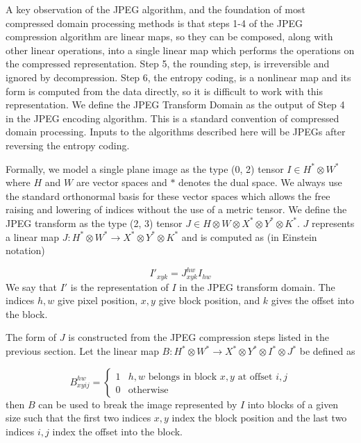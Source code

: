 \documentclass[10pt,twocolumn,letterpaper]{article}
\begin{document}
A key observation of the JPEG algorithm, and the foundation of most compressed domain processing methods \cite{chang1992video, chang1993new, natarajan1995fast, shen1995inner, shen1996direct, shen1998block, smith1993algorithms, smith1994fast} is that steps 1-4 of the JPEG compression algorithm are linear maps, so they can be composed, along with other linear operations, into a single linear map which performs the operations on the compressed representation. Step 5, the rounding step, is irreversible and ignored by decompression. Step 6, the entropy coding, is a nonlinear map and its form is computed from the data directly, so it is difficult to work with this representation. We define the JPEG Transform Domain as the output of Step 4 in the JPEG encoding algorithm. This is a standard convention of compressed domain processing. Inputs to the algorithms described here will be JPEGs after reversing the entropy coding.

Formally, we model a single plane image as the type (0, 2) tensor $I \in H^* \otimes W^*$ where $H$ and $W$ are vector spaces and $*$ denotes the dual space. We always use the standard orthonormal basis for these vector spaces which allows the free raising and lowering of indices without the use of a metric tensor.
We define the JPEG transform as the type (2, 3) tensor $J \in H \otimes W \otimes X^* \otimes Y^* \otimes K^*$. $J$ represents a linear map $J: H^* \otimes W^* \rightarrow X^* \otimes Y^* \otimes K^*$ and is computed as (in Einstein notation) 

\begin{equation}
I'_{xyk} = J^{hw}_{xyk}I_{hw}
\end{equation}
We say that $I'$ is the representation of $I$ in the JPEG transform domain. The indices $h,w$ give pixel position, $x,y$ give block position, and $k$ gives the offset into the block.

The form of $J$ is constructed from the JPEG compression steps listed in the previous section. Let the linear map $B: H^* \otimes W^* \rightarrow X^* \otimes Y^* \otimes I^* \otimes J^*$ be defined as 

\begin{equation}
B^{hw}_{xyij} = \left\{ \begin{array}{lr} 1 & \text{$h,w$ belongs in block $x,y$ at offset $i,j$} \\ 0 & \text{otherwise} \end{array} \right.
\end{equation} 
then $B$ can be used to break the image represented by $I$ into blocks of a given size such that the first two indices $x,y$ index the block position and the last two indices $i,j$ index the offset into the block.
\end{document}
